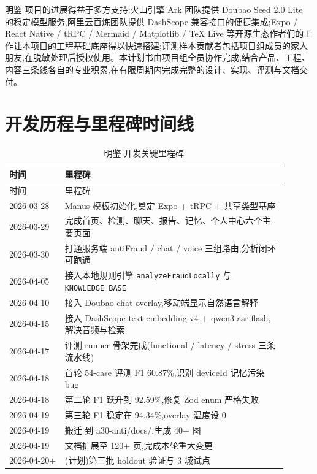 \documentclass[UTF8,a4paper,12pt]{ctexart}
\newcommand{\codepath}[1]{\seqsplit{#1}}
\begin{document}
明鉴 项目的进展得益于多方支持:火山引擎 Ark 团队提供 Doubao Seed 2.0 Lite 的稳定模型服务,阿里云百炼团队提供 DashScope 兼容接口的便捷集成;Expo / React Native / tRPC / Mermaid / Matplotlib / TeX Live 等开源生态作者们的工作让本项目的工程基础底座得以快速搭建;评测样本贡献者包括项目组成员的家人朋友,在脱敏处理后授权使用。本计划书由项目组全员协作完成,结合产品、工程、内容三条线各自的专业积累,在有限周期内完成完整的设计、实现、评测与文档交付。

\section{开发历程与里程碑时间线}

\begin{longtable}{p{0.18\linewidth}p{0.72\linewidth}}
    \caption{明鉴 开发关键里程碑}
    \label{tab:milestones} \\
    \toprule
    时间 & 里程碑 \\
    \midrule
    \endfirsthead
    \toprule
    时间 & 里程碑 \\
    \midrule
    \endhead
    2026-03-28 & Manus 模板初始化,奠定 Expo + tRPC + 共享类型基座 \\
    2026-03-29 & 完成首页、检测、聊天、报告、记忆、个人中心六个主要页面 \\
    2026-03-30 & 打通服务端 antiFraud / chat / voice 三组路由;分析闭环可跑通 \\
    2026-04-05 & 接入本地规则引擎 \texttt{analyzeFraudLocally} 与 \texttt{KNOWLEDGE\_BASE} \\
    2026-04-10 & 接入 Doubao chat overlay,移动端显示自然语言解释 \\
    2026-04-15 & 接入 DashScope text-embedding-v4 + qwen3-asr-flash,解决音频与检索 \\
    2026-04-17 & 评测 runner 骨架完成(functional / latency / stress 三条流水线) \\
    2026-04-18 & 首轮 54-case 评测 F1 60.87\%,识别 deviceId 记忆污染 bug \\
    2026-04-18 & 第二轮 F1 跃升到 92.59\%,修复 Zod enum 严格失败 \\
    2026-04-19 & 第三轮 F1 稳定在 94.34\%,overlay 温度设 0 \\
    2026-04-19 & 搬迁 \codepath{a30-project-plan.tex} 到 a30-anti/docs/,生成 40+ 图 \\
    2026-04-19 & 文档扩展至 120+ 页,完成本轮重大变更 \\
    2026-04-20+ & (计划)第三批 holdout 验证与 3 城试点 \\
    \bottomrule
\end{longtable}
\end{document}
